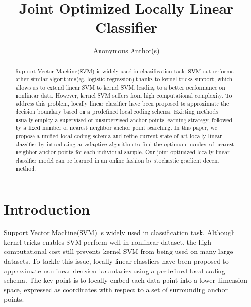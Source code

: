 \documentclass{llncs}
\begin{document}
	\title{Joint Optimized Locally Linear Classifier}
	\author{Anonymous Anthor(s)}
	\maketitle
	
	\begin{abstract}
	Support Vector Machine(SVM) is widely used in classification task. SVM outperforms other similar algorithms(eg. logistic regression) thanks to kernel tricks support, which allows us to extend linear SVM to kernel SVM, leading to a better performance on nonlinear data. However, kernel SVM suffers from high computational complexity. To address this problem, locally linear classifier have been proposed to approximate the decision boundary based on a predefined local coding schema. Existing methods usually employ a supervised or unsupervised anchor points learning strategy, followed by a fixed number of nearest neighbor anchor point searching. In this paper, we propose a unified local coding schema and refine current state-of-art locally linear classifier by introducing an adaptive algorithm to find the optimum number of nearest neighbor anchor points for each individual sample. Our joint optimized locally linear classifier model can be learned in an online fashion by stochastic gradient decent method.
 	\end{abstract}
	
	\section{Introduction}
	Support Vector Machine(SVM) is widely used in classification task. Although kernel tricks \cite{1} enables SVM perform well in nonlinear dataset, the high computational cost still prevents kernel SVM from being used on many large datasets. To tackle this issue, locally linear classfiers \cite{2} \cite{3} have been proposed to approximate nonlinear decision boundaries using a predefined local coding schema. The key point is to locally embed each data point into a lower dimension space, expressed as coordinates with respect to a set of surrounding anchor points.
	
\end{document}
